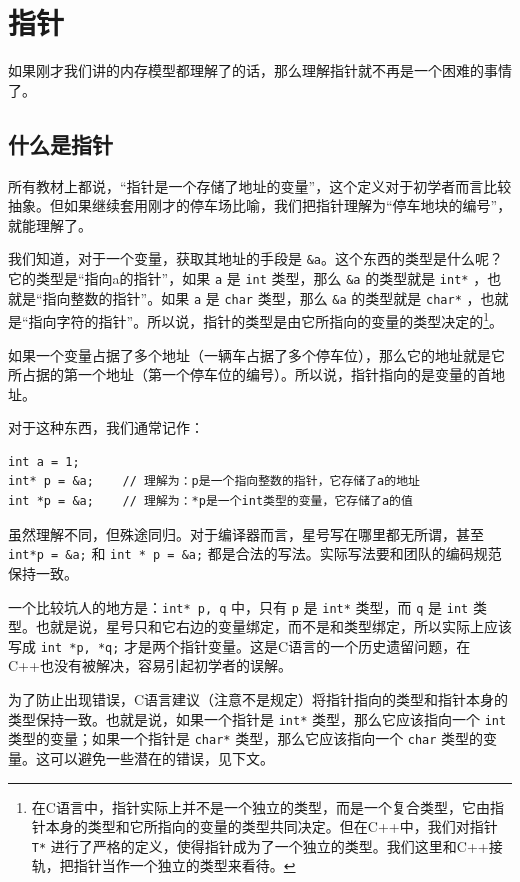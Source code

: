 \section{指针}\label{sec:pointer}

如果刚才我们讲的内存模型都理解了的话，那么理解指针就不再是一个困难的事情了。

\subsection{什么是指针}

所有教材上都说，“指针是一个存储了地址的变量”，这个定义对于初学者而言比较抽象。但如果继续套用刚才的停车场比喻，我们把指针理解为“停车地块的编号”，就能理解了。

我们知道，对于一个变量，获取其地址的手段是 \texttt{&a}。这个东西的类型是什么呢？它的类型是“指向a的指针”，如果 \verb|a| 是 \verb|int| 类型，那么 \verb|&a| 的类型就是 \verb|int*| ，也就是“指向整数的指针”。如果 \verb|a| 是 \verb|char| 类型，那么 \verb|&a| 的类型就是 \verb|char*| ，也就是“指向字符的指针”。所以说，指针的类型是由它所指向的变量的类型决定的\footnote{在C语言中，指针实际上并不是一个独立的类型，而是一个复合类型，它由指针本身的类型和它所指向的变量的类型共同决定。但在C++中，我们对指针 \texttt{T*} 进行了严格的定义，使得指针成为了一个独立的类型。我们这里和C++接轨，把指针当作一个独立的类型来看待。}。

如果一个变量占据了多个地址（一辆车占据了多个停车位），那么它的地址就是它所占据的第一个地址（第一个停车位的编号）。所以说，指针指向的是变量的首地址。

对于这种东西，我们通常记作：
\begin{verbatim}
int a = 1;      
int* p = &a;    // 理解为：p是一个指向整数的指针，它存储了a的地址
int *p = &a;    // 理解为：*p是一个int类型的变量，它存储了a的值
\end{verbatim}
虽然理解不同，但殊途同归。对于编译器而言，星号写在哪里都无所谓，甚至 \texttt{int*p = &a;} 和 \texttt{int * p = &a;} 都是合法的写法。实际写法要和团队的编码规范保持一致。

一个比较坑人的地方是：\texttt{int* p, q} 中，只有 \verb|p| 是 \verb|int*| 类型，而 \verb|q| 是 \verb|int| 类型。也就是说，星号只和它右边的变量绑定，而不是和类型绑定，所以实际上应该写成 \texttt{int *p, *q;} 才是两个指针变量。这是C语言的一个历史遗留问题，在C++也没有被解决，容易引起初学者的误解。

为了防止出现错误，C语言建议（注意不是规定）将指针指向的类型和指针本身的类型保持一致。也就是说，如果一个指针是 \verb|int*| 类型，那么它应该指向一个 \verb|int| 类型的变量；如果一个指针是 \verb|char*| 类型，那么它应该指向一个 \verb|char| 类型的变量。这可以避免一些潜在的错误，见下文。


